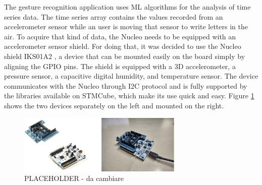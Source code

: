\documentclass[12pt]{report}
\begin{document}
The gesture recognition application uses ML algorithms for the analysis of time series data. The time series array contains the values recorded from an accelerometer sensor while an user is moving that sensor to write letters in the air. To acquire that kind of data, the Nucleo needs to be equipped with an accelerometer sensor shield. For doing that, it was decided to use the Nucleo shield IKS01A2 \autocite{shield_web_page}, a device that can be mounted easily on the board simply by aligning the GPIO pins. The shield is equipped with a 3D accelerometer, a pressure sensor, a capacitive digital humidity, and temperature sensor. The device communicates with the Nucleo through I2C protocol and is fully supported by the libraries available on STMCube, which make its use quick and easy. Figure \ref{fig:hardware_stm} shows the two devices separately on the left and mounted on the right.\\

\begin{figure}[h!]
    \centering
    \includegraphics[width=0.7\textwidth]{Figures/Chapter2/hardware_stm.jpg} 
    \caption{PLACEHOLDER - da cambiare}
    \label{fig:hardware_stm}    
\end{figure}
\end{document}
